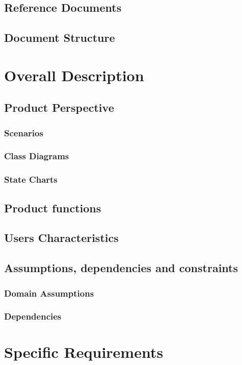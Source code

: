 \documentclass[a4paper,11pt]{report}
\begin{document}
\section{Reference Documents}

\section{Document Structure}


\chapter{Overall Description}

\section{Product Perspective}
\subsection{Scenarios}
\subsection{Class Diagrams}
\subsection{State Charts}

\section{Product functions}

\section{Users Characteristics}

\section{Assumptions, dependencies and constraints}
\subsection{Domain Assumptions}
\subsection{Dependencies}


\chapter{Specific Requirements}
\end{document}
